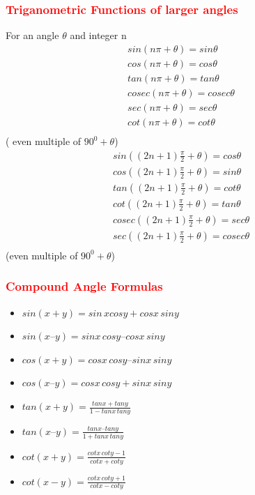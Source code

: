 \documentclass[12pt]{article}
\theoremstyle{colored}
\theoremstyle{subcolored}
\begin{document}
\begin{multicols}{2}
 \subsubsection*{\large \textcolor{red}{Triganometric Functions of larger angles}}
For an angle $\theta$  and integer n\\
\begin{align*}
    sin(n \pi+ \theta)=sin \theta \\
    cos(n \pi+ \theta)=cos \theta \\
        tan(n \pi+ \theta)=tan \theta \\
          cosec(n \pi+ \theta)=cosec \theta \\
            sec(n \pi+ \theta)=sec \theta \\
              cot(n \pi+ \theta)=cot \theta \\
\end{align*}
( even multiple of $90^0 + \theta$)
\begin{align*}
    sin((2n+1) \frac{\pi}{2}+ \theta)=cos \theta \\
    cos((2n+1) \frac{\pi}{2}+ \theta)=sin \theta \\
    tan((2n+1) \frac{\pi}{2}+ \theta)=cot \theta \\
    cot((2n+1) \frac{\pi}{2}+ \theta)=tan \theta \\
    cosec((2n+1) \frac{\pi}{2}+ \theta)=sec \theta \\
    sec((2n+1) \frac{\pi}{2}+ \theta)=cosec \theta \\
\end{align*}
(even multiple of $90^0 + \theta$)
\subsubsection*{\large \textcolor{red}{Compound Angle Formulas}}
\begin{itemize}
    \item $sin(x + y) = sin\, x cos y + cos x \,sin y$

\item $sin(x – y) = sin x \,cos y – cos x\, sin y$

\item $cos(x + y) = cos x\, cos y – sin x \,sin y$

\item $cos(x – y) = cos x\, cos y + sin x\, sin y$

\item  $tan ( x + y) =\frac{tan x + tan y}{1 - tan x\, tan y}$
\item $tan ( x – y) =\frac{tan x – tan y}{1 + tan x\, tan y}$
\item $cot(x+y)=\frac{cotx \,coty-1}{cot x+cot y}$
\item  $cot(x-y)=\frac{cotx \,coty+1}{cot x-cot y}$


\end{itemize}
\end{multicols}
\end{document}
